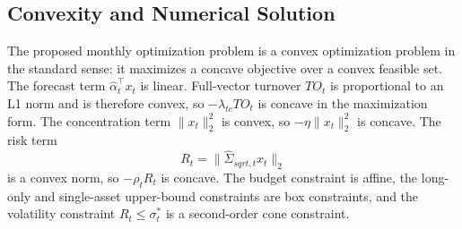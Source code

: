 \documentclass[11pt]{article}
\begin{document}
\subsection{Convexity and Numerical Solution}

The proposed monthly optimization problem is a convex optimization problem in the
standard sense: it maximizes a concave objective over a convex feasible set. The
forecast term \(\hat{\alpha}_t^\top x_t\) is linear. Full-vector turnover
\(TO_t\) is proportional to an L1 norm and is therefore convex, so
\(-\lambda_{tc}TO_t\) is concave in the maximization form. The concentration term
\(\|x_t\|_2^2\) is convex, so \(-\eta\|x_t\|_2^2\) is concave. The risk term
\[
R_t=\|\hat{\Sigma}_{sqrt,t}x_t\|_2
\]
is a convex norm, so \(-\rho_t R_t\) is concave. The budget constraint is affine,
the long-only and single-asset upper-bound constraints are box constraints, and
the volatility constraint \(R_t\le\sigma_t^*\) is a second-order cone constraint.
\end{document}
